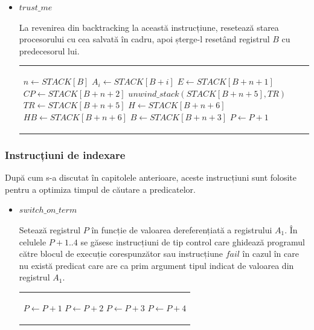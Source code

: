 \documentclass[12pt,a4paper,twoside]{report}
\begin{document}
\begin{itemize}
	\item \(trust\_me\) \\
	\begin{minipage}{0.45\textwidth}
		   La revenirea din backtracking la această instrucțiune, resetează starea procesorului cu cea salvată în cadru, apoi șterge-l resetând registrul $B$ cu predecesorul lui.
        \end{minipage}%
	\hfill
	\begin{minipage}{0.45\textwidth}
	\begin{tabular}{|p{\textwidth}}
	\begin{algorithmic}
		\State $n \gets STACK[B]$
		 \For{$i < n$}
            		\State $A_i \gets STACK[B + i]$
		 \EndFor
		\State $E \gets STACK[B+n+1]$
		\State $CP \gets STACK[B+n+2]$
		\State $unwind\_stack(STACK[B+n+5], TR)$
		\State $TR \gets STACK[B+n+5]$
		\State $H \gets STACK[B+n+6]$
		\State $HB \gets STACK[B+n+6]$
		\State $B \gets STACK[B+n+3]$
		\State $P \gets P + 1$
	\end{algorithmic}
	\end{tabular}
	\end{minipage}%
\end{itemize}

\subsubsection{Instrucțiuni de indexare}

După cum s-a discutat în capitolele anterioare, aceste instrucțiuni sunt folosite pentru a optimiza timpul de căutare a predicatelor.

\begin{itemize}
	\item \(switch\_on\_term\) \\
	\begin{minipage}{0.45\textwidth}
		  Setează registrul $P$ în funcție de valoarea dereferențiată a registrului $A_1$. În celulele $P+1..4$ se găsesc instrucțiuni de tip control care ghidează programul către blocul de execuție corespunzător sau instrucțiune $fail$ în cazul în care nu există predicat care are ca prim argument tipul indicat de valoarea din registrul $A_1$.
        \end{minipage}%
	\hfill
	\begin{minipage}{0.45\textwidth}
	\begin{tabular}{|p{\textwidth}}
	\begin{algorithmic}
		\Switch{$STORE[deref(A_1)]$}
			\Case{$<REF, _>$}
				\State $P \gets P + 1$
			\EndCase
			\Case{$<CON, _>$}
				\State $P \gets P + 2$
			\EndCase
			\Case{$<LIS, _>$}
				\State $P \gets P + 3$
			\EndCase
			\Case{$<STR, _>$}
				\State $P \gets P + 4$
			\EndCase
		\EndSwitch		
	\end{algorithmic}
	\end{tabular}
	\end{minipage}%
\end{itemize}
\end{document}
